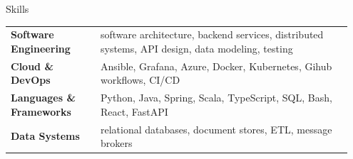 \documentclass[
	a4paper, %
	10pt, %
]{resume} %
\begin{document}


\begin{rSection}{Skills}
	\begin{tabular}{@{}p{0.25\linewidth} p{0.70\linewidth}@{}}
		\textbf{Software Engineering}     & software architecture, backend services, distributed systems, API design, data modeling, testing \\
		\textbf{Cloud \& DevOps}          & Ansible, Grafana, Azure, Docker, Kubernetes, Gihub workflows, CI/CD \\
		\textbf{Languages \& Frameworks}  & Python, Java, Spring, Scala, TypeScript, SQL, Bash, React, FastAPI \\
		\textbf{Data Systems}             & relational databases, document stores, ETL, message brokers \\
	\end{tabular}
\end{rSection}

\end{document}
